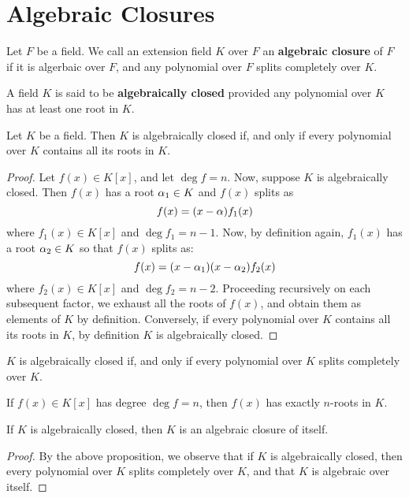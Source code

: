 \section{Algebraic Closures}
\label{section_8.5}

\begin{definition}
  Let $F$ be a field. We call an extension field $K$ over $F$ an
  \textbf{algebraic closure} of $F$ if it is algerbaic over $F$, and
  any polynomial over $F$ splits completely over $K$.
\end{definition}

\begin{definition}
  A field $K$ is said to be  \textbf{algebraically closed} provided
  any polynomial over $K$ has at least one root in $K$.
\end{definition}

\begin{proposition}
  Let $K$ be a field. Then $K$ is algebraically closed if, and only if
  every polynomial over $K$ contains all its roots in $K$.
\end{proposition}
\begin{proof}
  Let $f(x) \in K[x]$, and let $\deg{f}=n$. Now, suppose  $K$ is
  algebraically closed. Then $f(x)$ has a root $\alpha_1 \in K$ and
  $f(x)$ splits as
  \begin{equation*}
    f(x)=(x-\alpha)f_1(x)
  \end{equation*}
  where $f_1(x) \in K[x]$ and $\deg{f_1}=n-1$. Now, by definition
  again, $f_1(x)$ has a root $\alpha_2 \in K$ so that $f(x)$ splits as:
  \begin{equation*}
    f(x)=(x-\alpha_1)(x-\alpha_2)f_2(x)
  \end{equation*}
  where $f_2(x) \in K[x]$ and $\deg{f_2}=n-2$. Proceeding recursively
  on each subsequent factor, we exhaust all the roots of $f(x)$, and
  obtain them as elements of $K$ by definition. Conversely, if every
  polynomial over $K$ contains all its roots in $K$, by definition $K$
  is algebraically closed.
\end{proof}
\begin{corollary}
  $K$ is algebraically closed if, and only if every polynomial over
  $K$ splits completely over $K$.
\end{corollary}
\begin{corollary}
  If $f(x) \in K[x]$ has degree $\deg{f}=n$, then $f(x)$ has exactly
  $n$-roots in $K$.
\end{corollary}

\begin{proposition}\label{proposition_8.5.2}
  If $K$ is algebraically closed, then  $K$ is an algebraic closure
  of itself.
\end{proposition}
\begin{proof}
  By the above proposition, we observe that if $K$ is algebraically
  closed, then every polynomial over $K$ splits completely over $K$,
  and that $K$ is algebraic over itself.
\end{proof}

